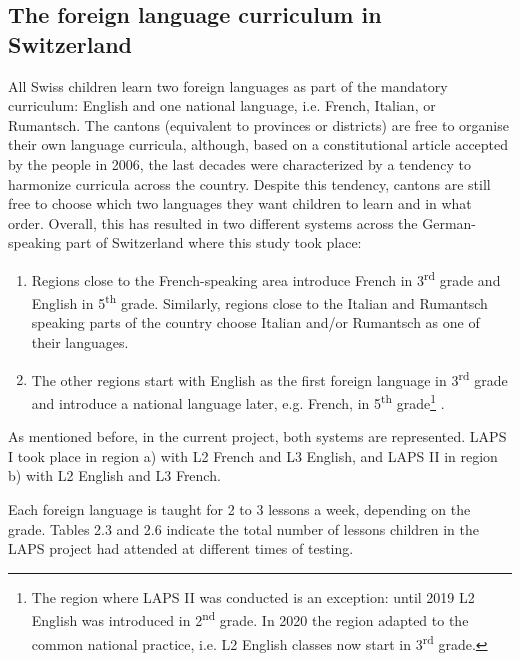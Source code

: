 \documentclass[output=paper]{langsci/langscibook}
\begin{document}
 \subsection{The foreign language curriculum in Switzerland}


All Swiss children learn two foreign languages as part of the mandatory curriculum: English and one national language, i.e. French, Italian, or Rumantsch. The cantons (equivalent to provinces or districts) are free to organise their own language curricula, although, based on a constitutional article accepted by the people in 2006, the last decades were characterized by a tendency to harmonize curricula across the country. Despite this tendency, cantons are still free to choose which two languages they want children to learn and in what order. Overall, this has resulted in two different systems across the German-speaking part of Switzerland where this study took place:

\begin{enumerate}[label=\alph*.]
\item Regions close to the French-speaking area introduce French in 3\textsuperscript{rd} grade and English in 5\textsuperscript{th} grade. Similarly, regions close to the Italian and Rumantsch speaking parts of the country choose Italian and/or Rumantsch as one of their languages.
\item The other regions start with English as the first foreign language in 3\textsuperscript{rd} grade and introduce a national language later, e.g. French, in 5\textsuperscript{th} grade\footnote{The region where LAPS II was conducted is an exception: until 2019 L2 English was introduced in 2\textsuperscript{nd} grade. In 2020 the region adapted to the common national practice, i.e. L2 English classes now start in 3\textsuperscript{rd} grade.} .
\end{enumerate}

As mentioned before, in the current project, both systems are represented. LAPS I took place in region a) with L2 French and L3 English, and LAPS II in region b) with L2 English and L3 French.

Each foreign language is taught for 2 to 3 lessons a week, depending on the grade. Tables 2.3 and 2.6 indicate the total number of lessons children in the LAPS project had attended at different times of testing. 
\end{document}
